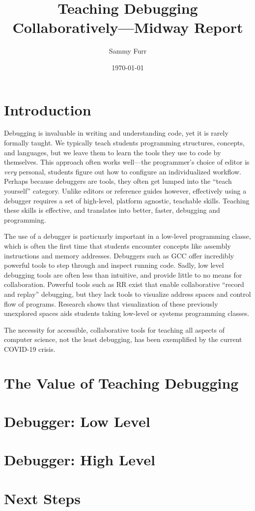 \documentclass[12pt, twocolumn]{article}
\author{Sammy Furr}
\title{Teaching Debugging Collaboratively---Midway Report}
\date{\today}
\begin{document}
\begin{titlepage}
\maketitle
\end{titlepage}

\section{Introduction}

Debugging is invaluable in writing and understanding code, yet it is
rarely formally taught.  We typically teach students programming
structures, concepts, and languages, but we leave them to learn the
tools they use to code by themselves.  This approach often works
well---the programmer's choice of editor is \textit{very} personal,
students figure out how to configure an individualized workflow.
Perhaps because debuggers are tools, they often get lumped into the
``teach yourself'' category.  Unlike editors or reference guides
however, effectively using a debugger requires a set of high-level,
platform agnostic, teachable skills.  Teaching these skills is
effective, and translates into better, faster, debugging and
programming.\cite{10.1145/3286960.3286970}\cite{10.1145/3361721.3361724}\par

The use of a debugger is particuarly important in a low-level
programming classe, which is often the first time that students
encounter concepts like assembly instructions and memory addresses.
Debuggers such as GCC offer incredibly powerful tools to step through
and inspect running code.  Sadly, low level debugging tools are often
less than intuitive, and provide little to no means for collaboration.
Powerful tools such as RR exist that enable collaborative ``record and
replay'' debugging\cite{DBLP:journals/corr/OCallahanJFHNP17}, but they
lack tools to visualize address spaces and control flow of programs.
Research shows that visualization of these previously unexplored
spaces aids students taking low-level or systems programming
classes\cite{10.1145/3328778.3366894}.\par

The necessity for accessible, collaborative tools for teaching all
aspects of computer science, not the least debugging, has been
exemplified by the current COVID-19 crisis.

\section{The Value of Teaching Debugging}

\section{Debugger: Low Level}

\section{Debugger: High Level}

\section{Next Steps}

\pagebreak

{}
\end{document}
